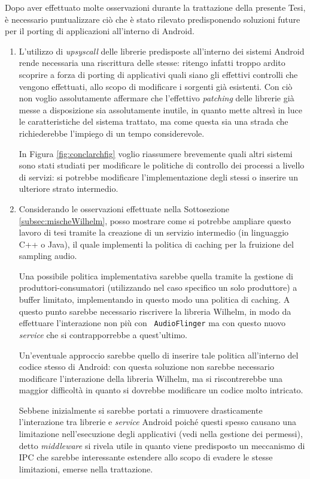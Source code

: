 Dopo aver effettuato molte osservazioni durante la trattazione della presente
Tesi, è necessario puntualizzare ciò che è stato rilevato predisponendo soluzioni
future per il porting di applicazioni all'interno di Android.
\begin{enumerate}
\item L'utilizzo di \textit{upsyscall} delle librerie predisposte all'interno dei
	sistemi Android rende necessaria una riscrittura delle stesse: ritengo
	infatti troppo ardito scoprire a forza di porting di applicativi
	quali siano gli effettivi controlli che vengono effettuati, allo scopo di 
	modificare i sorgenti già esistenti. Con ciò non voglio assolutamente
	affermare che l'effettivo \textit{patching} delle librerie già messe a disposizione
	sia assolutamente inutile, in quanto mette altresì in luce le caratteristiche
	del sistema trattato, ma come questa sia una strada che richiederebbe
	l'impiego di un tempo considerevole. 
	
	In Figura \vref{fig:conclarchfig} voglio riassumere brevemente quali
	altri sistemi sono stati studiati per modificare le politiche di controllo dei
	processi a livello di servizi:
	 si potrebbe modificare l'implementazione degli stessi
	o  inserire un ulteriore strato intermedio.
\item Considerando le osservazioni effettuate nella Sottosezione \vref{subsec:mischeWilhelm},
	posso mostrare come si potrebbe ampliare questo lavoro di tesi tramite
	la creazione di un servizio intermedio (in linguaggio C++ o Java),
	il quale implementi la politica di caching per la fruizione del sampling
	audio.
	
	Una possibile politica implementativa sarebbe quella tramite la gestione
	di produttori-consumatori (utilizzando nel caso specifico un solo
	produttore) a buffer limitato, implementando in questo modo una politica
	di caching. A questo punto sarebbe necessario riscrivere la libreria
	Wilhelm, in modo da effettuare l'interazione non più con \texttt{\small 
	AudioFlinger} ma con questo nuovo \textit{service} che si contrapporrebbe
	a quest'ultimo. 
	
	Un'eventuale approccio sarebbe quello di inserire tale politica all'interno
	del codice stesso di Android: con questa soluzione non sarebbe necessario
	modificare l'interazione della libreria Wilhelm, ma si riscontrerebbe
	una maggior difficoltà in quanto si dovrebbe modificare un codice molto
	intricato.
	
	Sebbene inizialmente si sarebbe portati a rimuovere drasticamente l'interazione
	tra librerie e \textit{service} Android poiché questi spesso causano una limitazione
	nell'esecuzione degli applicativi (vedi nella gestione dei permessi),
	detto \textit{middleware} si rivela utile in quanto viene predisposto un
	meccanismo di IPC che sarebbe interessante estendere allo scopo di 
	evadere le stesse limitazioni, emerse nella trattazione.
	

\end{enumerate}

